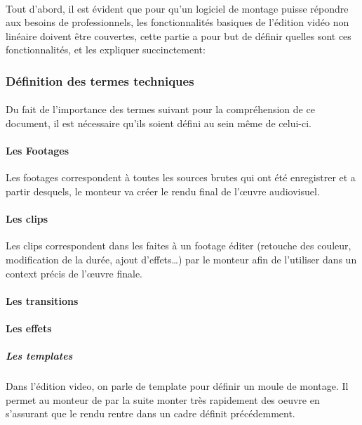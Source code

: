 \paragraph{}
Tout d'abord, il est évident que pour qu'un logiciel de montage puisse répondre
aux besoins de professionnels, les fonctionnalités basiques de l'édition vidéo
non linéaire doivent être couvertes, cette partie a pour but de définir quelles
sont ces fonctionnalités, et les expliquer succinctement:

\subsubsection{Définition des termes techniques}

\paragraph {}
Du fait de l'importance des termes suivant pour la compréhension de ce document,
il est nécessaire qu'ils soient défini au sein même de celui-ci.

\paragraph{Les Footages}
Les footages correspondent à toutes les sources brutes qui ont été enregistrer
et a partir desquels, le monteur va créer le rendu final de l'œuvre 
audiovisuel.

\paragraph{Les clips}
Les clips correspondent dans les faites à un footage éditer (retouche des
couleur, modification de la durée, ajout d'effets\ldots) par le monteur
afin de l'utiliser dans un context précis de l'œuvre finale.

\paragraph{Les transitions}


\paragraph{Les effets}

\subparagraph{Les templates}
Dans l'édition video, on parle de template pour définir un moule de montage.
Il permet au monteur de par la suite monter très rapidement des oeuvre en
s'assurant que le rendu rentre dans un cadre définit précédemment.

